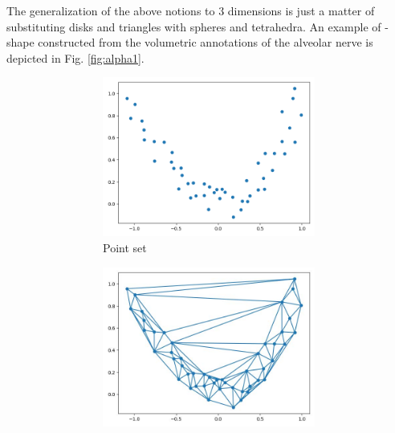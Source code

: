The generalization of the above notions to $3$ dimensions is just a matter of
substituting disks and triangles with spheres and tetrahedra. An example of
\textalpha-shape constructed from the volumetric annotations of the alveolar
nerve is depicted in Fig. \ref{fig:alpha1}.
\begin{figure}[h!]
  \centering
  \begin{subfigure}{1\textwidth}
    \centering
    \begin{subfigure}{0.24\textwidth}
      \centering
      \includegraphics[width=\textwidth]{Images/alpha_1.png}
      \caption{Point set}
      \label{fig:pointset}
    \end{subfigure}
    \begin{subfigure}{0.24\textwidth}
      \centering
      \includegraphics[width=\textwidth]{Images/alpha_2.jpg}

\end{subfigure}
\end{subfigure}
\end{figure}
